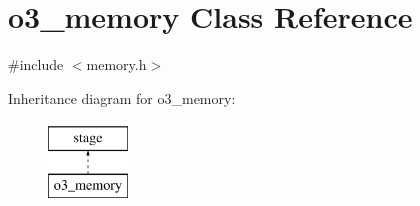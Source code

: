 \hypertarget{classo3__memory}{
\section{o3\_\-memory Class Reference}
\label{classo3__memory}
}


{\ttfamily \#include $<$memory.h$>$}

Inheritance diagram for o3\_\-memory:\begin{figure}[H]
\begin{center}
\leavevmode
\includegraphics[height=2.000000cm]{classo3__memory}
\end{center}
\end{figure}
